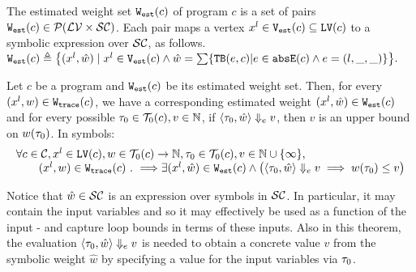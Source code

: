 \begin{defn}
 \label{def:adaptfun-weight}
The estimated weight set $\mathtt{{W_{est}}}(c)$ of program $c$ is a set of pairs $\mathtt{{W_{est}}}(c) \in \mathcal{P}(\mathcal{LV} \times \mathcal{SC})$.
Each pair maps
a vertex $x^l \in\mathtt{{V_{est}}}(c)\subseteq  \mathtt{LV}(c)$ to a symbolic expression over $\mathcal{SC}$,
as follows.
 $
 \progW(c) \triangleq
 \left\{ (x^l, \hat{w}) 
\mid
x^l \in \progV(c) 
\land 
\hat{w} = 
\sum\left\{ \absclr(e, c) \middle\vert e \in \absE(c) \land e = (l, \_, \_) \right\}
\right\}.
$
\end{defn}
%
\begin{thm}
 \label{thm:addweight_soundness}
Let ${c}$ be a program and $\mathtt{{W_{est}}}(c)$ be its estimated weight set.
Then, for every  $(x^l, w) \in \mathtt{{W_{trace}}}(c) $,
we have a corresponding estimated weight $(x^l, \hat{w}) \in \mathtt{{W_{est}}}(c)$ and for every possible 
$\mathtt{\tau}_0 \in \mathcal{T}_0(c),
v \in \mathbb{N}$,
if $\langle \mathtt{\tau}_0, \hat{w} \rangle \Downarrow_e v$,
then $v$ is an upper bound on ${w}(\mathtt{\tau}_0)$. In symbols:
\[
 \begin{array}{l}
 \forall c \in \mathcal{C}, x^l \in \mathtt{LV}(c),w\in \mathcal{T}_0(c)\to \mathbb{N},\mathtt{\tau}_0 \in \mathcal{T}_0(c), 
v \in \mathbb{N}\cup \{\infty\}, 
\\ \qquad
(x^l, w) \in \mathtt{{W_{trace}}}(c) ~.~ \Longrightarrow
\exists
(x^l, \hat{w}) \in \mathtt{{W_{est}}}(c) 
\land
\big(
 \langle \mathtt{\tau}_0, \hat{w} \rangle \Downarrow_e v \implies w(\mathtt{\tau}_0) \leq v
\big)
\end{array}
\]
\end{thm}
Notice that $\hat{w} \in \mathcal{SC}$ is an expression over symbols in $\mathcal{SC}$. In particular, it may contain the input variables and so it may effectively be used as a function of the input - and capture loop bounds in terms of these inputs.
Also in this theorem, the evaluation $\langle \mathtt{\tau}_0, \hat{w} \rangle \Downarrow_e v$ is needed to obtain a concrete value $v$ from the symbolic weight $\hat{w}$ by specifying a value for the input variables via $\mathtt{\tau}_0$.


